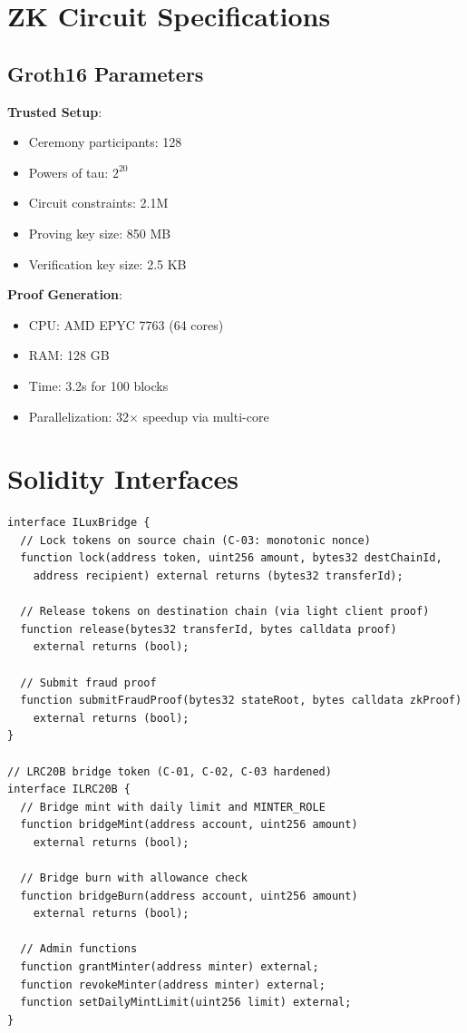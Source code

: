 \documentclass[11pt]{article}
\begin{document}
\appendix

\section{ZK Circuit Specifications}

\subsection{Groth16 Parameters}

\textbf{Trusted Setup}:
\begin{itemize}[leftmargin=1.1em]
  \item Ceremony participants: 128
  \item Powers of tau: $2^{20}$
  \item Circuit constraints: 2.1M
  \item Proving key size: 850 MB
  \item Verification key size: 2.5 KB
\end{itemize}

\textbf{Proof Generation}:
\begin{itemize}[leftmargin=1.1em]
  \item CPU: AMD EPYC 7763 (64 cores)
  \item RAM: 128 GB
  \item Time: 3.2s for 100 blocks
  \item Parallelization: 32$\times$ speedup via multi-core
\end{itemize}

\section{Solidity Interfaces}

\begin{verbatim}
interface ILuxBridge {
  // Lock tokens on source chain (C-03: monotonic nonce)
  function lock(address token, uint256 amount, bytes32 destChainId,
    address recipient) external returns (bytes32 transferId);

  // Release tokens on destination chain (via light client proof)
  function release(bytes32 transferId, bytes calldata proof)
    external returns (bool);

  // Submit fraud proof
  function submitFraudProof(bytes32 stateRoot, bytes calldata zkProof)
    external returns (bool);
}

// LRC20B bridge token (C-01, C-02, C-03 hardened)
interface ILRC20B {
  // Bridge mint with daily limit and MINTER_ROLE
  function bridgeMint(address account, uint256 amount)
    external returns (bool);

  // Bridge burn with allowance check
  function bridgeBurn(address account, uint256 amount)
    external returns (bool);

  // Admin functions
  function grantMinter(address minter) external;
  function revokeMinter(address minter) external;
  function setDailyMintLimit(uint256 limit) external;
}
\end{verbatim}
\end{document}
